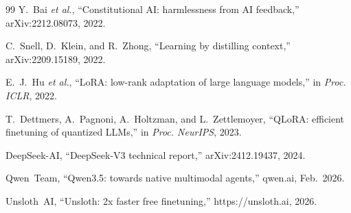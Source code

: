 \documentclass[conference]{IEEEtran}
\begin{document}
\begin{thebibliography}{99}
Y.~Bai \emph{et al.},
``Constitutional AI: harmlessness from AI feedback,'' arXiv:2212.08073, 2022.

C.~Snell, D.~Klein, and R.~Zhong,
``Learning by distilling context,'' arXiv:2209.15189, 2022.

E.~J.~Hu \emph{et al.},
``LoRA: low-rank adaptation of large language models,'' in \emph{Proc. ICLR}, 2022.

T.~Dettmers, A.~Pagnoni, A.~Holtzman, and L.~Zettlemoyer,
``QLoRA: efficient finetuning of quantized LLMs,'' in \emph{Proc. NeurIPS}, 2023.

DeepSeek-AI,
``DeepSeek-V3 technical report,'' arXiv:2412.19437, 2024.

Qwen~Team,
``Qwen3.5: towards native multimodal agents,'' qwen.ai, Feb.~2026.

Unsloth~AI, ``Unsloth: 2x faster free finetuning,'' https://unsloth.ai, 2026.

\end{thebibliography}
\end{document}
